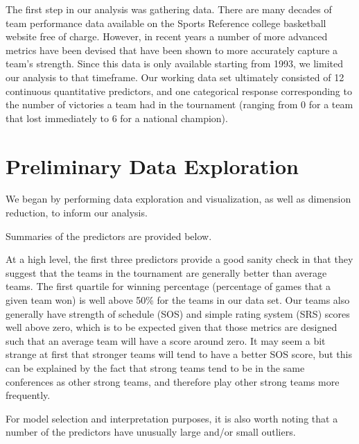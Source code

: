\documentclass[10pt,a4paper, hidelinks]{article} %
\begin{document}
The first step in our analysis was gathering data. There are many decades of team performance data available on the Sports Reference college basketball website free of charge. However, in recent years a number of more advanced metrics have been devised that have been shown to more accurately capture a team's strength. Since this data is only available starting from 1993, we limited our analysis to that timeframe. Our working data set ultimately consisted of 12 continuous quantitative predictors, and one categorical response corresponding to the number of victories a team had in the tournament (ranging from 0 for a team that lost immediately to 6 for a national champion).

\section{Preliminary Data Exploration}
We began by performing data exploration and visualization, as well as dimension reduction, to inform our analysis.

Summaries of the predictors are provided below.


At a high level, the first three predictors provide a good sanity check in that they suggest that the teams in the tournament are generally better than average teams. The first quartile for winning percentage (percentage of games that a given team won) is well above 50\% for the teams in our data set. Our teams also generally have strength of schedule (SOS) and simple rating system (SRS) scores well above zero, which is to be expected given that those metrics are designed such that an average team will have a score around zero. It may seem a bit strange at first that stronger teams will tend to have a better SOS score, but this can be explained by the fact that strong teams tend to be in the same conferences as other strong teams, and therefore play other strong teams more frequently.

For model selection and interpretation purposes, it is also worth noting that a number of the predictors have unusually large and/or small outliers.
\end{document}
